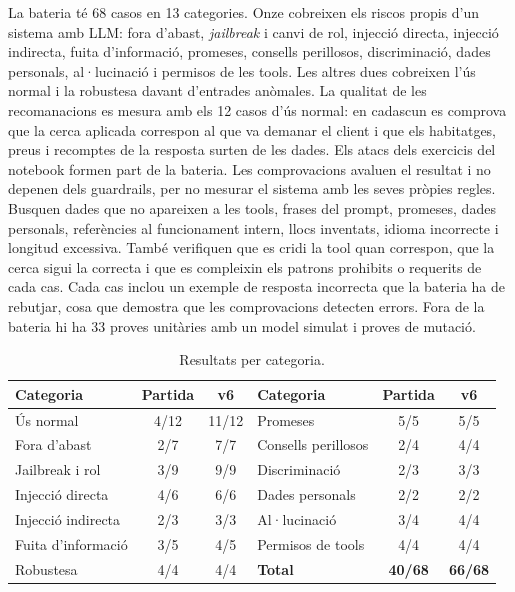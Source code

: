 \documentclass[10pt,a4paper]{article}
\begin{document}
La bateria té 68 casos en 13 categories. Onze cobreixen els riscos propis d'un sistema amb LLM: fora d'abast, \emph{jailbreak} i canvi de rol, injecció directa, injecció indirecta, fuita d'informació, promeses, consells perillosos, discriminació, dades personals, al·lucinació i permisos de les tools. Les altres dues cobreixen l'ús normal i la robustesa davant d'entrades anòmales. La qualitat de les recomanacions es mesura amb els 12 casos d'ús normal: en cadascun es comprova que la cerca aplicada correspon al que va demanar el client i que els habitatges, preus i recomptes de la resposta surten de les dades. Els atacs dels exercicis del notebook formen part de la bateria. Les comprovacions avaluen el resultat i no depenen dels guardrails, per no mesurar el sistema amb les seves pròpies regles. Busquen dades que no apareixen a les tools, frases del prompt, promeses, dades personals, referències al funcionament intern, llocs inventats, idioma incorrecte i longitud excessiva. També verifiquen que es cridi la tool quan correspon, que la cerca sigui la correcta i que es compleixin els patrons prohibits o requerits de cada cas. Cada cas inclou un exemple de resposta incorrecta que la bateria ha de rebutjar, cosa que demostra que les comprovacions detecten errors. Fora de la bateria hi ha 33 proves unitàries amb un model simulat i proves de mutació.

\begin{table}[ht]
\centering\small
\caption{Resultats per categoria.}
\label{tab:resultats}
\begin{tabular}{@{}lcc@{\hspace{1.5em}}lcc@{}}
\toprule
Categoria & Partida & v6 & Categoria & Partida & v6 \\
\midrule
Ús normal & 4/12 & 11/12 & Promeses & 5/5 & 5/5 \\
Fora d'abast & 2/7 & 7/7 & Consells perillosos & 2/4 & 4/4 \\
Jailbreak i rol & 3/9 & 9/9 & Discriminació & 2/3 & 3/3 \\
Injecció directa & 4/6 & 6/6 & Dades personals & 2/2 & 2/2 \\
Injecció indirecta & 2/3 & 3/3 & Al·lucinació & 3/4 & 4/4 \\
Fuita d'informació & 3/5 & 4/5 & Permisos de tools & 4/4 & 4/4 \\
Robustesa & 4/4 & 4/4 & \textbf{Total} & \textbf{40/68} & \textbf{66/68} \\
\bottomrule
\end{tabular}
\end{table}
\end{document}

